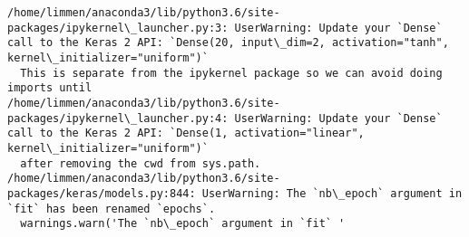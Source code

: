 \documentclass[11pt]{article}
\begin{document}
    \begin{Verbatim}[commandchars=\\\{\}]
/home/limmen/anaconda3/lib/python3.6/site-packages/ipykernel\_launcher.py:3: UserWarning: Update your `Dense` call to the Keras 2 API: `Dense(20, input\_dim=2, activation="tanh", kernel\_initializer="uniform")`
  This is separate from the ipykernel package so we can avoid doing imports until
/home/limmen/anaconda3/lib/python3.6/site-packages/ipykernel\_launcher.py:4: UserWarning: Update your `Dense` call to the Keras 2 API: `Dense(1, activation="linear", kernel\_initializer="uniform")`
  after removing the cwd from sys.path.
/home/limmen/anaconda3/lib/python3.6/site-packages/keras/models.py:844: UserWarning: The `nb\_epoch` argument in `fit` has been renamed `epochs`.
  warnings.warn('The `nb\_epoch` argument in `fit` '

    \end{Verbatim}
\end{document}
